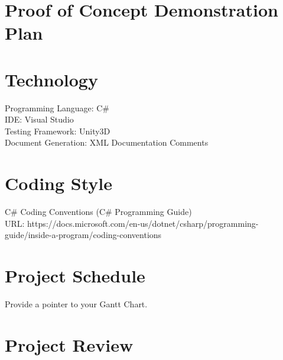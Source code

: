 \documentclass{article}
\begin{document}
\section{Proof of Concept Demonstration Plan}

\section{Technology}
Programming Language: C\# \\
IDE: Visual Studio\\
Testing Framework: Unity3D\\
Document Generation: XML Documentation Comments

\section{Coding Style}
C\# Coding Conventions (C\# Programming Guide)\\
URL: https://docs.microsoft.com/en-us/dotnet/csharp/programming-guide/inside-a-program/coding-conventions

\section{Project Schedule}

Provide a pointer to your Gantt Chart.

\section{Project Review}
\end{document}
